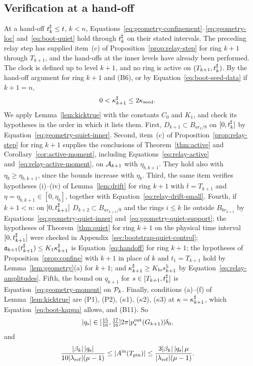 \subsection{Verification at a hand-off}
\label{sec:bootstrap-handoff-checks}

At a hand-off $t^\sharp_k\le t$, $k<n$, Equations~\eqref{eq:geometry-confinement}--\eqref{eq:geometry-loc}
and~\eqref{eq:boot-quiet} hold through $t^\sharp_k$ on their stated intervals.
The preceding relay step has supplied item~(c) of
Proposition~\ref{prop:relay-step} for ring $k+1$ through $T_{k+1}$, and the
hand-offs at the inner levels have already been performed.
The clock is defined up to level $k+1$, and no ring is active on
$(T_{k+1},t^\sharp_k)$.
By the hand-off argument for ring $k+1$ and
(B6), or by Equation~\eqref{eq:boot-seed-data} if $k+1=n$,
\begin{equation}
\label{eq:boot-kappa}
0<\kappa^\sharp_{k+1}\le2\kappa_{\mathrm{seed}} .
\end{equation}
We apply Lemma~\ref{lem:kicktrue} with the constants $C_0$ and $K_1$, and check
its hypotheses in the order in which it lists them. First,
$D_{k+1}\subset B_{ar_k/8}$ on $[0,t^\sharp_k]$ by
Equation~\eqref{eq:geometry-quiet-inner}. Second, item~(c) of
Proposition~\ref{prop:relay-step} for ring $k+1$ supplies the conclusions of
Theorem~\ref{thm:active} and Corollary~\ref{cor:active-moment}, including
Equations~\eqref{eq:relay-active} and~\eqref{eq:relay-active-moment}, on
$\mathcal{A}_{k+1}$ with $\eta_{b,k+1}$. They hold also with
$\eta_b\ge\eta_{b,k+1}$, since the bounds increase with $\eta_b$.
Third, the same item verifies hypotheses (i)--(iv) of
Lemma~\ref{lem:drift} for ring $k+1$ with $\bar t=T_{k+1}$ and
$\eta=\eta_{b,k+1}\in[0,\eta_b]$, together with
Equation~\eqref{eq:relay-drift-small}. Fourth, if $k+1<n$: on $[0,t^\sharp_{k+1}]$
$D_{k+2}\subset B_{ar_{k+1}/8}$ and the rings $i\le k$ lie outside $B_{6r_{k+1}}$
by Equations~\eqref{eq:geometry-quiet-inner} and~\eqref{eq:geometry-quiet-support};
the hypotheses of Theorem~\ref{thm:quiet} for ring $k+1$ on the physical time
interval $[0,t^\sharp_{k+1}]$ were checked in
Appendix~\ref{sec:bootstrap-quiet-control}; $\mathfrak{a}_{k+1}(t^\sharp_{k+1})\le K_1\kappa^\sharp_{k+1}$ is
Equation~\eqref{eq:handoff} for ring $k+1$; the hypotheses of
Proposition~\ref{prop:confine} with $k+1$ in place of $k$ and $t_1=T_{k+1}$ hold
by Lemma~\ref{lem:geometry}(a) for $k+1$; and
$\kappa^\sharp_{k+1}\ge K_{\mathrm{lo}} s_{k+1}^5$ by Equation~\eqref{eq:relay-amplitudes}. Fifth, the bound
on $q_{k+1}$ for $s\in[T_{k+1},t^\sharp_k]$ is
Equation~\eqref{eq:geometry-moment} on $\mathcal{P}_k$. Finally, conditions (a)--(f) of
Lemma~\ref{lem:kicktrue} are (P1), (P2), ($\kappa$1), ($\kappa$2), ($\kappa$3) at
$\kappa=\kappa^\sharp_{k+1}$, which Equation~\eqref{eq:boot-kappa} allows, and (B11). So
\begin{equation}
\label{eq:boot-qstar}
|q_{\mathrm{s}}|\in[\tfrac{15}{16},\tfrac{17}{16}]2\pi|p^{\mathrm{out}}_*(G_{k+1})|\delta_0,
\end{equation}
and
\begin{equation}
\label{eq:boot-kick}
\frac{|\beta_k|\,|q_{\mathrm{s}}|}{10|\lambda_{\mathrm{ref}}|(\mu-1)}\le|A^{\mathrm{in}}(T_{\mathrm{pin}})|\le\frac{3|\beta_k|\,|q_{\mathrm{s}}|\,\mu}{|\lambda_{\mathrm{ref}}|(\mu-1)} .
\end{equation}

